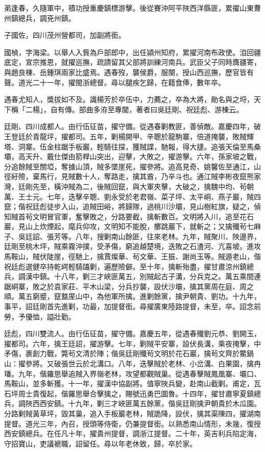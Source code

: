 \begin{pinyinscope}
弟逢春，久隨軍中，積功授重慶鎮標游擊。後從賽沖阿平陜西洋縣匪，累擢山東曹州鎮總兵，調兗州鎮。

子國佐，四川茂州營都司，加副將銜。

國楨，字海梁。以舉人入貲為戶部郎中，出任潁州知府，累擢河南布政使。洎回疆底定，宣宗推恩，就擢巡撫，疏請留其父部將訓練河南兵。武臣父子同時膺疆寄，與趙良棟、岳鍾琪兩家比盛焉。遇春歿，襲侯爵，服闋，授山西巡撫，歷官皆有聲。道光二十一年，擢閩浙總督。尋以腿疾乞歸，在籍食俸，數年卒。

遇春尤知人，獎拔如不及。識楊芳於卒伍中，力薦之，卒為大將，勛名與之埒，天下稱「二楊」，自有傳。部曲多洊至專閫，著者曰吳廷剛、祝廷彪、游棟云。

廷剛、四川成都人。由行伍征苗，擢守備。從遇春剿教匪，善偵敵。嘉慶四年，破王登廷於青龍坪，擢都司。五年，剿楊開甲、辛聰於龍駒寨，倍道掩襲，敗賊輝塔、洞寨。伍金柱踞手板巖，輕騎往探，獲賊諜，馳報，得大捷。追張天倫至馬桑壩，高天升、戴仕傑由箭桿山突出，迎擊，大敗之，擢游擊。六年，孫家坡之戰，分追餘賊至關埡，奪據山頂，賊多墜崖死，擢參將。追高見奇、姚馨佐至通江，山徑紆險，棄馬行，見賊數十人，奪路走，擒其酋，乃辛斗也。通江賊李彬夜竄熊家灣，廷剛先至，橫沖賊為二，後賊回竄，與大軍夾擊，大破之，擒魏中均、茍朝萬、王士元。七年，迭擊辛聰、劉永受於老君嶺、菜子坪、太平峒、燕子巖，賊四竄；偕祝廷彪徒步入山，追賊田峪，將歸隊，過桃川沙壩，見山樹紅旗，疑之，偵知賊首茍文明冒官軍，奮擊敗之，分路要截，擒斬數百。文明將入川，追至花石巖，見山上炊煙起，麾兵仰攻，文明知不能脫，擲跳巖下，就斬之；又擒殲茍七麻子、吳廷詔、張芳等。八年，搜剿南山餘匪，往來老林。九年，賊聚川、陜邊界，廷剛至桃木坪，賊乘霧沖撲，受矛傷，窮追越楚境，迭敗之石渣河、亢喜坡。進攻馬鞍山，賊伏陡崖，徑馳上，擒賈燦華、茍文華、王振、謝尚玉等。賊遁老山，偕祝廷彪選健卒持乾崿輕騎躡剿，遍歷險僻。至十年，擒斬殆盡，擢甘肅涼州鎮總兵，調漢中鎮。十八年，剿三才峽匪萬五，別賊起古子溝，分兵克之。萬五乘間連踞峒寨，敗之於袁家莊、平木山梁，分兵抄襲，設伏沙壩，擒其黨周在庭、周之順。萬五窮蹙，竄盩厔山中，為他軍所擒。進剿餘黨，擒尹朝貴、劉功。十九年，事平，詔廷剛首先進剿，功最，加提督銜。尋擢廣東陸路提督，未至，卒。詔念前勞，予優恤，謚壯勤。

廷彪，四川雙流人。由行伍征苗，擢守備。嘉慶五年，從遇春殲劉元恭、劉開玉，擢都司。六年，擒王廷詔，擢游擊。七年，剿賊平安寨，設伏長溝，乘夜掩擊，中矛傷，裹創力戰，斃茍文清於陣；偕吳廷剛殲茍文明於花石巖，擒茍文齊於鱉鍋山：擢參將。又破張世云於北溝口。八年，迭擊賊於老林、小岔溝、白果園，擒冉璠。九年，偕羅思舉追賊入界嶺老林，攻望都觀賊巢。從遇春擊賊鳳凰寨、壩口、馬鞍山，並多斬獲。十一年，擢漢中協副將。值寧陜兵變，赴南山截剿。甫定，瓦石坪周士貴復起，偕羅思舉合擊擒之，賜號迅勇巴圖魯。十四年，擢甘肅寧夏鎮總兵，調陜西西安鎮。十九年，剿三才峽匪萬五餘黨，偕吳廷剛擒尹朝貴於木瓜園。分路剿賊黃草坪，毀其巢，追入手板巖老林，賊詭降，設伏，擒其渠陳四，擢湖南提督。道光三年，內召，授頭等侍衛，仍兼提督銜。以熟悉南山情形，未幾，復授西安鎮總兵。在任凡十年，擢貴州提督，調浙江提督。二十年，英吉利兵陷定海，守招寶山，吏議褫職，詔留任。尋以年老休致，歸，卒於家。


\end{pinyinscope}
